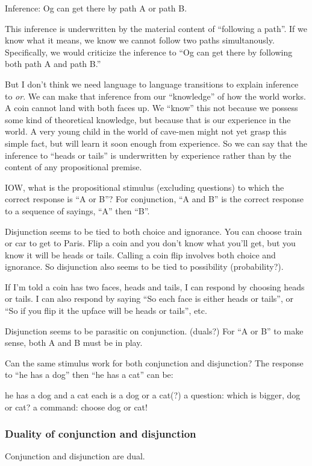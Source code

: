 Inference: Og can get there by path A or path B.

This inference is underwritten by the material content of ``following
a path''. If we know what it means, we know we cannot follow two paths
simultanously. Specifically, we would criticize the inference to ``Og
can get there by following both path A and path B.''

But I don't think we need language to language transitions to explain
inference to \textit{or}. We can make that inference from our
\enquote{knowledge} of how the world works. A coin cannot land with both
faces up. We ``know'' this not because we possess some kind of
theoretical knowledge, but because that is our experience in the
world. A very young child in the world of cave-men might not yet grasp
this simple fact, but will learn it soon enough from experience. So we
can say that the inference to ``heads or tails'' is underwritten by
experience rather than by the content of any propositional premise.

IOW, what is the propositional stimulus (excluding questions) to which
the correct response is ``A or B''? For conjunction, ``A and B'' is the
correct response to a sequence of sayings, ``A'' then ``B''.

Disjunction seems to be tied to both choice and ignorance. You can
choose train or car to get to Paris. Flip a coin and you don't know
what you'll get, but you know it will be heads or tails. Calling a
coin flip involves both choice and ignorance. So disjunction also
seems to be tied to possibility (probability?).

If I'm told a coin has two faces, heads and tails, I can respond by
choosing heads or tails. I can also respond by saying ``So each face
is either heads or tails'', or ``So if you flip it the upface will be
heads or tails'', etc.

Disjunction seems to be parasitic on conjunction. (duals?) For ``A or
B'' to make sense, both A and B must be in play.

Can the same stimulus work for both conjunction and disjunction? The
response to ``he has a dog'' then ``he has a cat'' can be:

he has a dog and a cat
each is a dog or a cat(?)
a question: which is bigger, dog or cat?
a command: choose dog or cat!

\subsubsection{Duality of conjunction and disjunction}
Conjunction and disjunction are dual.

